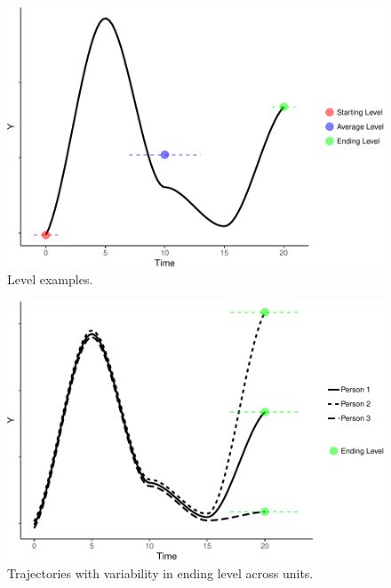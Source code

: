 \documentclass[english,,man]{apa6}
\theoremstyle{definition}
\theoremstyle{definition}
\theoremstyle{definition}
\theoremstyle{remark}
\begin{document}
\begin{figure}
\centering
\includegraphics{figures/unnamed-chunk-8-1.pdf}
\caption{\label{fig:unnamed-chunk-8}Level examples.\label{level}}
\end{figure}

\begin{figure}
\centering
\includegraphics{figures/unnamed-chunk-9-1.pdf}
\caption{\label{fig:unnamed-chunk-9}Trajectories with variability in ending
level across units.\label{level_var}}
\end{figure}
\end{document}
